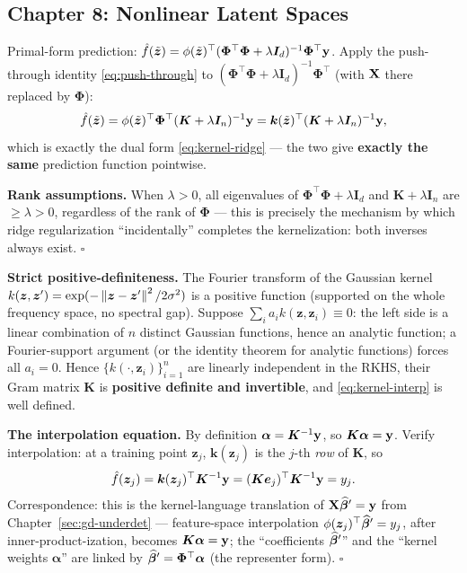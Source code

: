 \subsection{Chapter 8: Nonlinear Latent Spaces}

\begin{description}[style=nextline, itemsep=1.2ex]
\item[Exercise \ref{ex:kernel-dual} (primal form $=$ dual form of kernel ridge regression)]
Primal-form prediction: $\hat{f}(\tilde{\bm{z}}) = \phi(\tilde{\bm{z}})^\top(\bm{\Phi}^\top\bm{\Phi} + \lambda\bm{I}_d)^{-1}\bm{\Phi}^\top\mathbf{y}$. Apply the push-through identity \eqref{eq:push-through} to $(\bm{\Phi}^\top\bm{\Phi} + \lambda\bm{I}_d)^{-1}\bm{\Phi}^\top$ (with $\mathbf{X}$ there replaced by $\bm{\Phi}$):
\[
  \hat{f}(\tilde{\bm{z}})
  = \phi(\tilde{\bm{z}})^\top\bm{\Phi}^\top(\bm{K} + \lambda\bm{I}_n)^{-1}\mathbf{y}
  = \bm{k}(\tilde{\bm{z}})^\top(\bm{K} + \lambda\bm{I}_n)^{-1}\mathbf{y} ,
\]
which is exactly the dual form \eqref{eq:kernel-ridge} --- the two give \textbf{exactly the same} prediction function pointwise.

\textbf{Rank assumptions.} When $\lambda > 0$, all eigenvalues of $\bm{\Phi}^\top\bm{\Phi} + \lambda\bm{I}_d$ and $\bm{K} + \lambda\bm{I}_n$ are $\ge \lambda > 0$, regardless of the rank of $\bm{\Phi}$ --- this is precisely the mechanism by which ridge regularization ``incidentally'' completes the kernelization: both inverses always exist. $\square$

\item[Exercise \ref{ex:kernel-interp} (positive-definiteness of the Gaussian kernel and the interpolation equation)]
\textbf{Strict positive-definiteness.} The Fourier transform of the Gaussian kernel $k(\bm{z},\bm{z}') = \exp(-\left\lVert \bm{z}-\bm{z}' \right\rVert^2/2\sigma^2)$ is a positive function (supported on the whole frequency space, no spectral gap). Suppose $\sum_i a_i k(\bm{z},\bm{z}_i) \equiv 0$: the left side is a linear combination of $n$ distinct Gaussian functions, hence an analytic function; a Fourier-support argument (or the identity theorem for analytic functions) forces all $a_i = 0$. Hence $\{k(\cdot,\bm{z}_i)\}_{i=1}^n$ are linearly independent in the RKHS, their Gram matrix $\bm{K}$ is \textbf{positive definite and invertible}, and \eqref{eq:kernel-interp} is well defined.

\textbf{The interpolation equation.} By definition $\bm{\alpha} = \bm{K}^{-1}\mathbf{y}$, so $\bm{K}\bm{\alpha} = \mathbf{y}$. Verify interpolation: at a training point $\bm{z}_j$, $\bm{k}(\bm{z}_j)$ is the $j$-th \textit{row} of $\bm{K}$, so
\[
  \hat{f}(\bm{z}_j) = \bm{k}(\bm{z}_j)^\top\bm{K}^{-1}\mathbf{y} = (\bm{K}\bm{e}_j)^\top\bm{K}^{-1}\mathbf{y} = y_j .
\]
Correspondence: this is the kernel-language translation of $\mathbf{X}\widehat{\bm{\beta}}' = \mathbf{y}$ from Chapter~\ref{sec:gd-underdet} --- feature-space interpolation $\phi(\bm{z}_j)^\top\widehat{\bm{\beta}}' = y_j$, after inner-product-ization, becomes $\bm{K}\bm{\alpha} = \mathbf{y}$; the ``coefficients $\widehat{\bm{\beta}}'$'' and the ``kernel weights $\bm{\alpha}$'' are linked by $\widehat{\bm{\beta}}' = \bm{\Phi}^\top\bm{\alpha}$ (the representer form). $\square$


\end{description}
